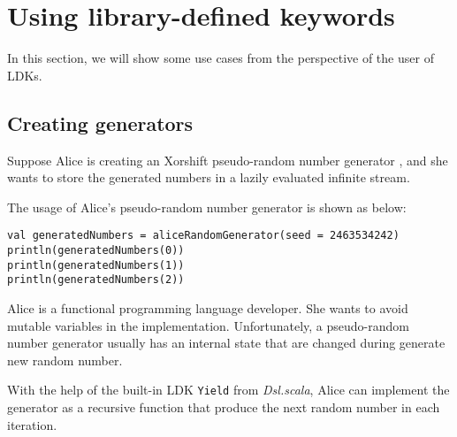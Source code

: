  


\section{Using library-defined keywords}\label{Using library-defined keywords}

In this section, we will show some use cases from the perspective of the user of LDKs.

\subsection{Creating generators}\label{Creating generators}

Suppose Alice is creating an Xorshift pseudo-random number generator \cite{marsaglia2003xorshift}, and she wants to store the generated numbers in a lazily evaluated infinite stream. 

The usage of Alice's pseudo-random number generator is shown as below:

\begin{lstlisting}[caption={Using Alice's pseudo-random number generator},label={generatedNumbers}]
val generatedNumbers = aliceRandomGenerator(seed = 2463534242)
println(generatedNumbers(0))
println(generatedNumbers(1))
println(generatedNumbers(2))
\end{lstlisting}

Alice is a functional programming language developer. She wants to avoid mutable variables in the implementation. Unfortunately, a pseudo-random number generator usually has an internal state that are changed during generate new random number.

With the help of the built-in LDK \lstinline{Yield} from \textit{Dsl.scala}, Alice can implement the generator as a recursive function that produce the next random number in each iteration.

